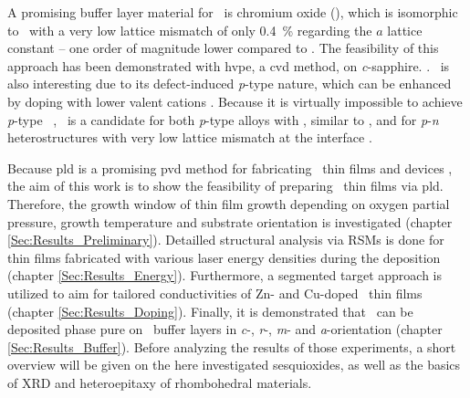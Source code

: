 A promising buffer layer material for \agao\ is chromium oxide (\cro), which is isomorphic to \agao\ with a very low lattice mismatch of only \qty{0.4}{\percent} regarding the $a$ lattice constant -- one order of magnitude lower compared to \alo.
The feasibility of this approach has been demonstrated with \acrfull{hvpe}, a \acrfull{cvd} method, on \textit{c}-sapphire.
    \cite{stepanov2021,polyakov2022,polyakov2022a,butenko2023}.
\cro\ is also interesting due to its defect-induced \textit{p}-type nature, which can be enhanced by doping with lower valent cations
    \cite{arca2011,arca2013,arca2017,farrell2015}.
Because it is virtually impossible to achieve \textit{p}-type \gao\
    \cite{pearton2018},
\cro\ is a candidate for both \textit{p}-type alloys with \agao, similar to 
    \cite{kaneko2021},
and for \textit{p}-\textit{n} heterostructures with very low lattice mismatch at the interface
    \cite{polyakov2022a}.

Because \acrfull{pld} is a promising \acrfull{pvd} method for fabricating \agao\ thin films and devices
    \cite{petersen2023,vogt2023,vogt2024},
the aim of this work is to show the feasibility of preparing \cro\ thin films via \acrshort{pld}.
Therefore, the growth window of thin film growth depending on oxygen partial pressure, growth temperature and substrate orientation is investigated (chapter \ref{Sec:Results_Preliminary}).
Detailled structural analysis via \glspl{RSM} is done for thin films fabricated with various laser energy densities during the deposition (chapter \ref{Sec:Results_Energy}).
Furthermore, a segmented target approach is utilized to aim for tailored conductivities of Zn- and Cu-doped \cro\ thin films (chapter \ref{Sec:Results_Doping}).
Finally, it is demonstrated that \agao\ can be deposited phase pure on \cro\ buffer layers in \textit{c}-, \textit{r}-, \textit{m}- and \textit{a}-orientation (chapter \ref{Sec:Results_Buffer}).
Before analyzing the results of those experiments, a short overview will be given on the here investigated sesquioxides, as well as the basics of \acrfull{XRD} and heteroepitaxy of rhombohedral materials.